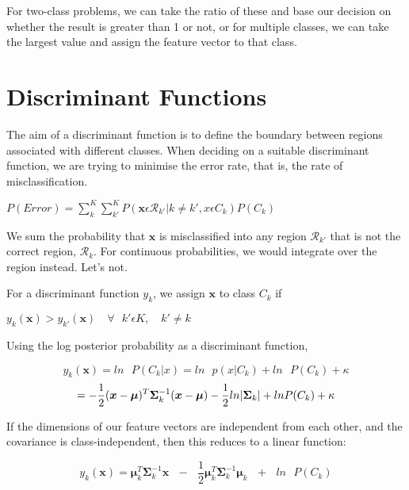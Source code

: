 \documentclass[10pt,a4paper]{article}
\newcommand{\su}[2]{\sum\limits_{#1}^{#2}}
\newcommand{\re}[1]{\frac{1}{#1}}
\begin{document}
			For two-class problems, we can take the ratio of these and base our decision on whether the result is greater than 1 or not, or for multiple classes, we can take the largest value and assign the feature vector to that class.
	
	\section{Discriminant Functions}
	
	The aim of a discriminant function is to define the boundary between regions associated with different classes. When deciding on a suitable discriminant function, we are trying to minimise the error rate, that is, the rate of misclassification.
	
	\begin{center}
		$ P(Error) = \su{k}{K} \su{k'}{K} P(\bm x \epsilon \mathcal{R}_{k'} | k \neq k', x \epsilon C_k)P(C_k) $
	\end{center}
	
	We sum the probability that $\bm x$ is misclassified into any region $\mathcal{R}_{k'}$ that is not the correct region, $\mathcal{R}_{k}$. For continuous probabilities, we would integrate over the region instead. Let's not.
	
	For a discriminant function $y_k$, we assign $\bm x$ to class $C_k$ if 
	\begin{center}
		$y_k(\bm x) > y_{k'}(\bm x) \quad  \forall \text{  }k' \epsilon K, \quad  k' \ne k $
	\end{center}
	
	Using the log posterior probability as a discriminant function, 
	
	\begin{equation*}
			y_k(\bm x) = ln\text{ }P(C_k|x) = ln\text{  }p(x|C_k) + ln\text{  }P(C_k) + \kappa
	\end{equation*}
	\begin{equation*}
		= -\re{2}(\bm x-\bm \mu)^T\bm \Sigma_k^{-1}(\bm x-\bm\mu)
			-\re{2} ln \abs{ \bm \Sigma_k} + ln\text{}P(C_k) + \kappa
	\end{equation*}
	
	If the dimensions of our feature vectors are independent from each other, and the covariance is class-independent, then this reduces to a linear function:
	
	
	\begin{equation*}
	y_k(\bm x) = \bm \mu_k^T\bm \Sigma_k^{-1}\bm x \text{  }-\text{  }\re{2}\bm \mu_k^T\bm \Sigma_k^{-1}\bm \mu_k \text{  }+\text{  } ln\text{ }P(C_k)
	\end{equation*}
	
\end{document}
